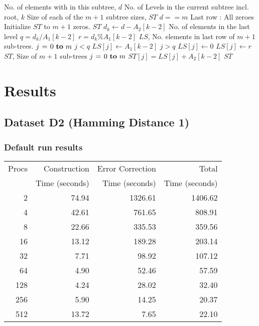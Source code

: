 \documentclass[integrals, nointegrals, article, 12pt, a4paper]{article}
\begin{document}
\begin{codebox}
\zi {} No. of elements with in this subtree, $d$
\zi {} No. of Levels in the current subtree incl. root, $k$
\zi {} Size of each of the $m+1$ subtree sizes, $ST$
\li \If $d == m$ \Comment Last row : All zeroes
\li \Do Initialize $ST$ to $m+1$ zeros.
\li     \Return $ST$ \End
\li $d_k \gets d - A_2[k - 2]$ \Comment No. of elements in the last level
\li $q = d_k / A_1[k - 2]$
\li $r = d_k \% A_1[k - 2]$
\zi \Comment $LS$, No. elements in last row of $m+1$ sub-trees.
\li \For $j \gets 0 \To m$
\li \Do \If $j < q$
\li        \Then $LS[j] \gets A_1[k - 2]$
\li      \ElseIf $j > q$
\li        \Then $LS[j] \gets 0$
\li      \Else
\li         $LS[j] \gets r$ \End
    \End
\zi \Comment $ST$, Size of $m+1$ sub-trees
\li \For $j \gets 0 \To m$
\li \Do $ST[j] = LS[j] + A_2[k-2]$ \End
\li \Return $ST$
\end{codebox}

\section{Results}
\label{sec-2}
\subsection{Dataset D2 (Hamming Distance 1)}
\label{sec-2-1}
\subsubsection{Default run results}
\label{sec-2-1-1}

\begin{center}
\begin{tabular}{rrrr}
\hline
Procs & Construction & Error Correction & Total\\
 & Time (seconds) & Time (seconds) & Time (seconds)\\
\hline
2 & 74.94 & 1326.61 & 1406.62\\
4 & 42.61 & 761.65 & 808.91\\
8 & 22.66 & 335.53 & 359.56\\
16 & 13.12 & 189.28 & 203.14\\
32 & 7.71 & 98.92 & 107.12\\
64 & 4.90 & 52.46 & 57.59\\
128 & 4.24 & 28.02 & 32.40\\
256 & 5.90 & 14.25 & 20.37\\
512 & 13.72 & 7.65 & 22.10\\
\hline
\end{tabular}
\end{center}
\end{document}
